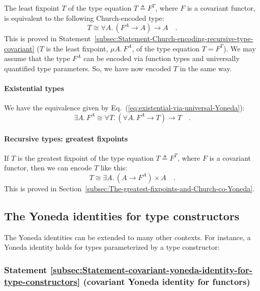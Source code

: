 The least fixpoint $T$ of the type equation $T\triangleq F^{T}$,
where $F$ is a covariant functor, is equivalent to the following
Church-encoded type:
\[
T\cong\forall A.\,(F^{A}\rightarrow A)\rightarrow A\quad.
\]
This is proved in Statement~\ref{subsec:Statement-Church-encoding-recursive-type-covariant}
($T$ is the least fixpoint, $\mu A.\,F^{A}$,
of the type equation $T=F^{T}$). We may assume that the type $F^{A}$
can be encoded via function types and universally quantified type
parameters. So, we have now encoded $T$ in the same way.

\paragraph{Existential types}

We have the equivalence given by Eq.~(\ref{eq:existential-via-universal-Yoneda}):
\[
\exists A.\,F^{A}\cong\forall T.\,(\forall A.\,F^{A}\rightarrow T)\rightarrow T\quad.
\]


\paragraph{Recursive types: greatest fixpoints}

If $T$ is the greatest fixpoint of the type equation $T\triangleq F^{T}$,
where $F$ is a covariant functor, then we can encode $T$ like this:
\[
T\cong\exists A.\,(A\rightarrow F^{A})\times A\quad.
\]
This is proved in Section~\ref{subsec:The-greatest-fixpoints-and-Church-co-Yoneda}.


\subsection{The Yoneda identities for type constructors\label{subsec:The-Yoneda-identities-for-type-constructors}}

The Yoneda identities can be extended to many other contexts. For
instance, a Yoneda identity holds for types parameterized by a type
constructor:

\subsubsection{Statement \label{subsec:Statement-covariant-yoneda-identity-for-type-constructors}\ref{subsec:Statement-covariant-yoneda-identity-for-type-constructors}
(covariant Yoneda identity for functors)}

